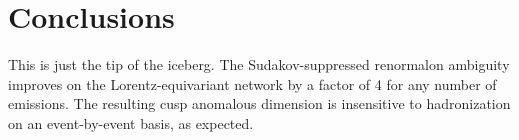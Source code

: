 \section{Conclusions}\label{sec:conclusions}

This is just the tip of the iceberg. The Sudakov-suppressed renormalon
ambiguity improves on the Lorentz-equivariant network by a factor of 4
for any number of emissions. The resulting cusp anomalous dimension is
insensitive to hadronization on an event-by-event basis, as expected.

